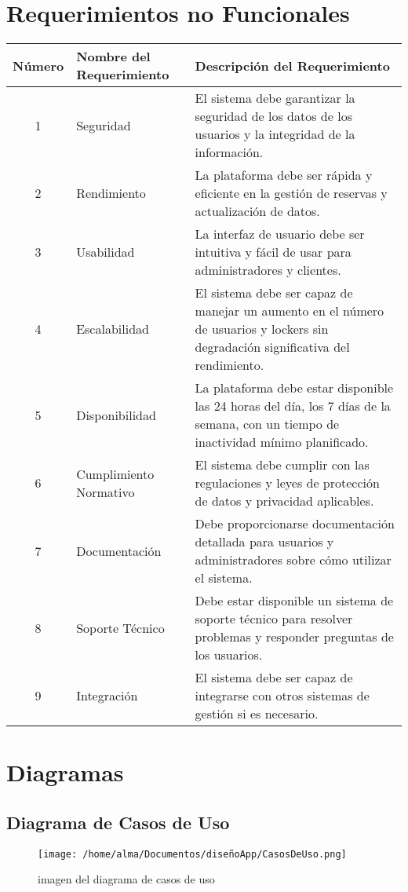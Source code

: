 \documentclass[12pt,a4paper]{article}
\begin{document}
\section{Requerimientos no Funcionales}
\begin{center}
\begin{tabular}{|c|l|p{8cm}|}
    \hline
    \textbf{Número} & \textbf{Nombre del Requerimiento} & \textbf{Descripción del Requerimiento} \\
    \hline
    1 & Seguridad & El sistema debe garantizar la seguridad de los datos de los usuarios y la integridad de la información. \\
    \hline
    2 & Rendimiento & La plataforma debe ser rápida y eficiente en la gestión de reservas y actualización de datos. \\
    \hline
    3 & Usabilidad & La interfaz de usuario debe ser intuitiva y fácil de usar para administradores y clientes. \\
    \hline
    4 & Escalabilidad & El sistema debe ser capaz de manejar un aumento en el número de usuarios y lockers sin degradación significativa del rendimiento. \\
    \hline
    5 & Disponibilidad & La plataforma debe estar disponible las 24 horas del día, los 7 días de la semana, con un tiempo de inactividad mínimo planificado. \\
    \hline
    6 & Cumplimiento Normativo & El sistema debe cumplir con las regulaciones y leyes de protección de datos y privacidad aplicables. \\
    \hline
    7 & Documentación & Debe proporcionarse documentación detallada para usuarios y administradores sobre cómo utilizar el sistema. \\
    \hline
    8 & Soporte Técnico & Debe estar disponible un sistema de soporte técnico para resolver problemas y responder preguntas de los usuarios. \\
    \hline
    9 & Integración & El sistema debe ser capaz de integrarse con otros sistemas de gestión si es necesario. \\
    \hline
\end{tabular}
\end{center}

\section{Diagramas}
\subsection{Diagrama de Casos de Uso}
\begin{figure}[H]
    \centering
     \texttt{[image: /home/alma/Documentos/diseñoApp/CasosDeUso.png]}
    \caption{imagen del diagrama de casos de uso}
    \label{fig:etiqueta}
\end{figure}
\end{document}
